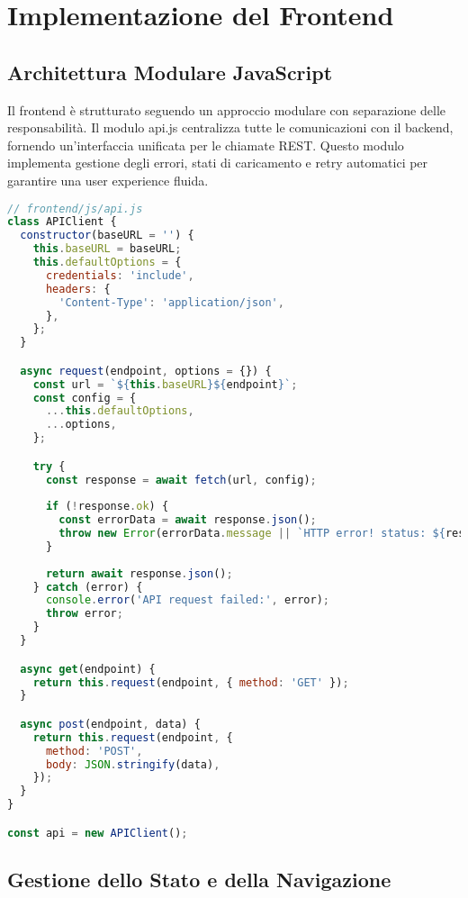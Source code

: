 \documentclass[12pt,a4paper]{article}
\begin{document}
\section{Implementazione del Frontend}

\subsection{Architettura Modulare JavaScript}

Il frontend è strutturato seguendo un approccio modulare con separazione delle responsabilità. Il modulo api.js centralizza tutte le comunicazioni con il backend, fornendo un'interfaccia unificata per le chiamate REST. Questo modulo implementa gestione degli errori, stati di caricamento e retry automatici per garantire una user experience fluida.

\begin{lstlisting}[language=JavaScript, caption=Client API centralizzato]
// frontend/js/api.js
class APIClient {
  constructor(baseURL = '') {
    this.baseURL = baseURL;
    this.defaultOptions = {
      credentials: 'include',
      headers: {
        'Content-Type': 'application/json',
      },
    };
  }

  async request(endpoint, options = {}) {
    const url = `${this.baseURL}${endpoint}`;
    const config = {
      ...this.defaultOptions,
      ...options,
    };

    try {
      const response = await fetch(url, config);
      
      if (!response.ok) {
        const errorData = await response.json();
        throw new Error(errorData.message || `HTTP error! status: ${response.status}`);
      }
      
      return await response.json();
    } catch (error) {
      console.error('API request failed:', error);
      throw error;
    }
  }

  async get(endpoint) {
    return this.request(endpoint, { method: 'GET' });
  }

  async post(endpoint, data) {
    return this.request(endpoint, {
      method: 'POST',
      body: JSON.stringify(data),
    });
  }
}

const api = new APIClient();
\end{lstlisting}

\subsection{Gestione dello Stato e della Navigazione}
\end{document}
